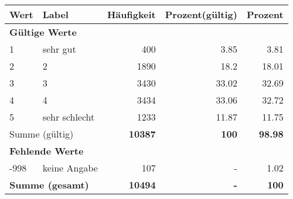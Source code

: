      \begin{longtable}{lXrrr}
     \toprule
     \textbf{Wert} & \textbf{Label} & \textbf{Häufigkeit} & \textbf{Prozent(gültig)} & \textbf{Prozent} \\
     \endhead
     \midrule
     \multicolumn{5}{l}{\textbf{Gültige Werte}}\\

     1 &
     \multicolumn{1}{X}{ sehr gut   } &


       \num{400} &
       \num[round-mode=places,round-precision=2]{3,85} &
         \num[round-mode=places,round-precision=2]{3,81} \\

     2 &
     \multicolumn{1}{X}{ 2   } &


       \num{1890} &
       \num[round-mode=places,round-precision=2]{18,2} &
         \num[round-mode=places,round-precision=2]{18,01} \\

     3 &
     \multicolumn{1}{X}{ 3   } &


       \num{3430} &
       \num[round-mode=places,round-precision=2]{33,02} &
         \num[round-mode=places,round-precision=2]{32,69} \\

     4 &
     \multicolumn{1}{X}{ 4   } &


       \num{3434} &
       \num[round-mode=places,round-precision=2]{33,06} &
         \num[round-mode=places,round-precision=2]{32,72} \\

     5 &
     \multicolumn{1}{X}{ sehr schlecht   } &


       \num{1233} &
       \num[round-mode=places,round-precision=2]{11,87} &
         \num[round-mode=places,round-precision=2]{11,75} \\
     \midrule
     \multicolumn{2}{l}{Summe (gültig)} &
       \textbf{\num{10387}} &
     \textbf{100} &
       \textbf{\num[round-mode=places,round-precision=2]{98,98}} \\
     \multicolumn{5}{l}{\textbf{Fehlende Werte}}\\
       -998 &
       keine Angabe &
         \num{107} &
        - &
         \num[round-mode=places,round-precision=2]{1,02} \\
     \midrule
     \multicolumn{2}{l}{\textbf{Summe (gesamt)}} &
          \textbf{\num{10494}} &
        \textbf{-} &
        \textbf{100} \\
     \bottomrule
     \end{longtable}
     
